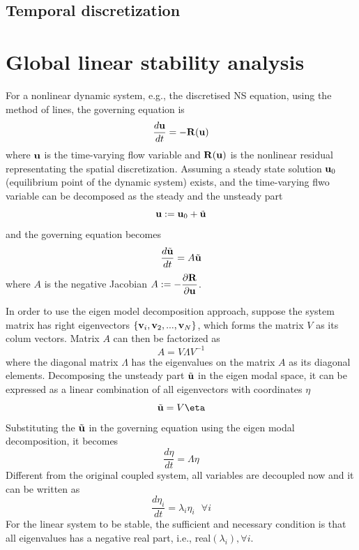 \documentclass[journal,final]{new-aiaa}
\begin{document}
\subsection{Temporal discretization}


\section{Global linear stability analysis}
For a nonlinear dynamic system, e.g., the discretised NS equation, using
the method of lines,
the governing equation is
\begin{equation}
\dfrac{d\mathbf{u}}{dt}=-\mathbf{R}(\mathbf{u})
\end{equation}
where $\mathbf{u}$ is the time-varying flow variable and $\mathbf{R}(\mathbf{u})$ is the nonlinear
residual representating the spatial discretization.
Assuming a steady state solution $\mathbf{u}_0$ (equilibrium point of the dynamic system)
exists, and the time-varying flwo variable can be decomposed as the
steady and the unsteady part 
\begin{equation}
\mathbf{u}:=\mathbf{u}_0 + \tilde {\mathbf{u}}
\end{equation}
and the governing equation becomes
\begin{equation}
\dfrac{d \tilde {\mathbf{u}}}{dt}=A \tilde {\mathbf{u}}
\end{equation}
where $A$ is the negative Jacobian $A:=-\dfrac{\partial\mathbf{R}}{\partial\mathbf{u}}$.

In order to use the eigen model decomposition approach, suppose
the system matrix has right eigenvectors $\{\mathbf{v}_i, \mathbf{v}_2, ..., \mathbf{v}_N\}$,
which forms the matrix $V$ as its colum vectors. Matrix $A$ can then
be factorized as 
\begin{equation}
A=V\Lambda V^{-1}
\end{equation}
where the diagonal matrix $\Lambda$ has the eigenvalues on the matrix $A$
as its diagonal elements.
Decomposing the unsteady part $\tilde {\mathbf{u}}$ in the eigen modal space,
it can be expressed as a linear combination of all eigenvectors with
coordinates $\eta$
\begin{equation}
\tilde \uu = V \eta
\end{equation}
Substituting the $\tilde {\mathbf{u}}$ in the governing equation using the eigen modal
decomposition, it becomes
\begin{equation}
\dfrac{d \eta}{dt}= \Lambda \eta
\end{equation}
Different from the original coupled system, all variables are decoupled now and it
can be written as
\begin{equation}
\dfrac{d \eta_i}{dt}= \lambda_i \eta_i  ~~~\forall i
\end{equation}
For the linear system to be stable, the sufficient and necessary condition is
that all eigenvalues has a negative real part, i.e., real$(\lambda_i), \forall i$.
\end{document}
